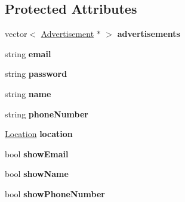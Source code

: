 \subsection*{Protected Attributes}
\begin{DoxyCompactItemize}
\item 
\hypertarget{class_user_a9a78e0f9ab50c5d9d3041d1d90acd4d8}{}vector$<$ \hyperlink{class_advertisement}{Advertisement} $\ast$ $>$ {\bfseries advertisements}\label{class_user_a9a78e0f9ab50c5d9d3041d1d90acd4d8}

\item 
\hypertarget{class_user_a2d678acd22b533660b4b7d8404961f14}{}string {\bfseries email}\label{class_user_a2d678acd22b533660b4b7d8404961f14}

\item 
\hypertarget{class_user_ab537b9a55bc7d7fcafcdf8e53d085e67}{}string {\bfseries password}\label{class_user_ab537b9a55bc7d7fcafcdf8e53d085e67}

\item 
\hypertarget{class_user_a643f85779a4693855c171c396f49e515}{}string {\bfseries name}\label{class_user_a643f85779a4693855c171c396f49e515}

\item 
\hypertarget{class_user_a727ba647fe019be6fa9c03308d60da9e}{}string {\bfseries phone\+Number}\label{class_user_a727ba647fe019be6fa9c03308d60da9e}

\item 
\hypertarget{class_user_a1c8e68a346c8a47d8cf0e75356c66562}{}\hyperlink{class_location}{Location} {\bfseries location}\label{class_user_a1c8e68a346c8a47d8cf0e75356c66562}

\item 
\hypertarget{class_user_a82dcde625983882667723c4549156db8}{}bool {\bfseries show\+Email}\label{class_user_a82dcde625983882667723c4549156db8}

\item 
\hypertarget{class_user_a0360d5ecb5643df7899cef2c1479bd30}{}bool {\bfseries show\+Name}\label{class_user_a0360d5ecb5643df7899cef2c1479bd30}

\item 
\hypertarget{class_user_af166bac19b9b0b9b85d1b51aaff9cbd9}{}bool {\bfseries show\+Phone\+Number}\label{class_user_af166bac19b9b0b9b85d1b51aaff9cbd9}

\end{DoxyCompactItemize}
